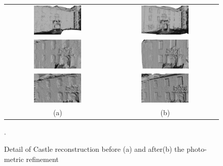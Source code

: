 \begin{figure}[tpb]
\centering
\begin{tabular}{cc}
\includegraphics[width=0.47\textwidth]{./img/ch-incr-dens/castle05}&
\includegraphics[width=0.47\textwidth]{./img/ch-incr-dens/castle06}\\
\includegraphics[width=0.47\textwidth]{./img/ch-incr-dens/castle07}&
\includegraphics[width=0.47\textwidth]{./img/ch-incr-dens/castle08}\\
\includegraphics[width=0.47\textwidth]{./img/ch-incr-dens/castle12}&
\includegraphics[width=0.47\textwidth]{./img/ch-incr-dens/castle11}\\
(a)&(b)
\end{tabular}
\caption{Detail of Castle reconstruction before (a) and after(b) the photo-metric refinement}.
\label{fig:detailcastle}
\end{figure}


